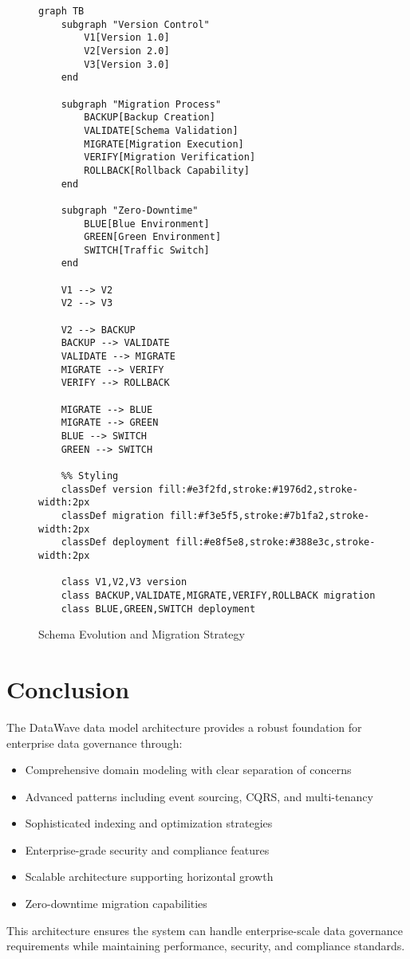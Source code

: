 \documentclass[12pt,a4paper]{article}
\begin{document}
\begin{figure}[H]
\centering
\begin{verbatim}
graph TB
    subgraph "Version Control"
        V1[Version 1.0]
        V2[Version 2.0]
        V3[Version 3.0]
    end
    
    subgraph "Migration Process"
        BACKUP[Backup Creation]
        VALIDATE[Schema Validation]
        MIGRATE[Migration Execution]
        VERIFY[Migration Verification]
        ROLLBACK[Rollback Capability]
    end
    
    subgraph "Zero-Downtime"
        BLUE[Blue Environment]
        GREEN[Green Environment]
        SWITCH[Traffic Switch]
    end
    
    V1 --> V2
    V2 --> V3
    
    V2 --> BACKUP
    BACKUP --> VALIDATE
    VALIDATE --> MIGRATE
    MIGRATE --> VERIFY
    VERIFY --> ROLLBACK
    
    MIGRATE --> BLUE
    MIGRATE --> GREEN
    BLUE --> SWITCH
    GREEN --> SWITCH
    
    %% Styling
    classDef version fill:#e3f2fd,stroke:#1976d2,stroke-width:2px
    classDef migration fill:#f3e5f5,stroke:#7b1fa2,stroke-width:2px
    classDef deployment fill:#e8f5e8,stroke:#388e3c,stroke-width:2px
    
    class V1,V2,V3 version
    class BACKUP,VALIDATE,MIGRATE,VERIFY,ROLLBACK migration
    class BLUE,GREEN,SWITCH deployment
\end{verbatim}
\caption{Schema Evolution and Migration Strategy}
\end{figure}

\section{Conclusion}

The DataWave data model architecture provides a robust foundation for enterprise data governance through:

\begin{itemize}
    \item Comprehensive domain modeling with clear separation of concerns
    \item Advanced patterns including event sourcing, CQRS, and multi-tenancy
    \item Sophisticated indexing and optimization strategies
    \item Enterprise-grade security and compliance features
    \item Scalable architecture supporting horizontal growth
    \item Zero-downtime migration capabilities
\end{itemize}

This architecture ensures the system can handle enterprise-scale data governance requirements while maintaining performance, security, and compliance standards.
\end{document}
